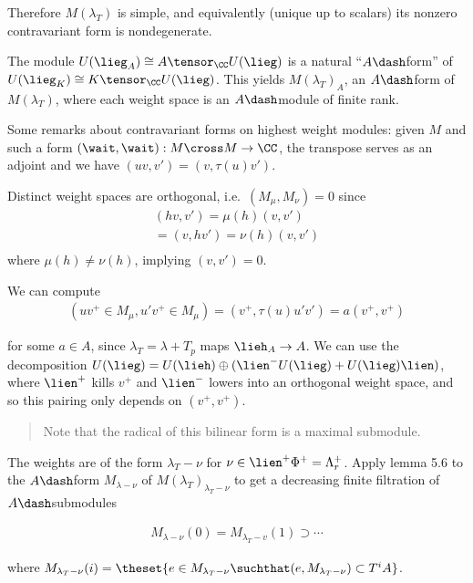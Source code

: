 Therefore \(M(\lambda_T)\) is simple, and equivalently (unique up to
scalars) its nonzero contravariant form is nondegenerate.

The module \(U(\lieg_A) \cong A \tensor_\CC U(\lieg)\) is a natural
``\(A\dash\)form'' of \(U(\lieg_K) \cong K \tensor_\CC U(\lieg)\). This
yields \(M(\lambda_T)_A\), an \(A\dash\)form of \(M(\lambda_T)\), where
each weight space is an \(A\dash\)module of finite rank.

Some remarks about contravariant forms on highest weight modules: given
\(M\) and such a form \((\wait, \wait): M\cross M \to \CC\), the
transpose serves as an adjoint and we have
\((uv, v') = (v, \tau(u) v')\).

Distinct weight spaces are orthogonal, i.e.~\((M_\mu, M_\nu) = 0\) since
\begin{align*}
(hv, v') = \mu(h) (v, v') \\
= (v, hv') = \nu(h) (v, v') \\
\end{align*} where \(\mu(h) \neq \nu(h)\), implying \((v, v') = 0\).

We can compute \begin{align*}
(u v^+ \in M_\mu, u' v^+ \in M_\mu) = (v^+, \tau(u) u' v') = a (v^+, v^+)
\end{align*}

for some \(a\in A\), since \(\lambda_T = \lambda + T_p\) maps
\(\lieh_A \to A\). We can use the decomposition
\(U(\lieg) = U(\lieh) \oplus (\lien^- U(\lieg) + U(\lieg) \lien)\),
where \(\lien^+\) kills \(v^+\) and \(\lien^-\) lowers into an
orthogonal weight space, and so this pairing only depends on
\((v^+, v^+)\).

\begin{quote}
Note that the radical of this bilinear form is a maximal submodule.
\end{quote}

The weights are of the form \(\lambda_T - \nu\) for
\(\nu \in \lien^+ \Phi^+ = \Lambda_r^+\). Apply lemma 5.6 to the
\(A\dash\)form \(M_{\lambda - \nu}\) of
\(M(\lambda_T)_{\lambda_T - \nu}\) to get a decreasing finite filtration
of \(A\dash\)submodules

\begin{align*}
M_{\lambda-\nu}(0)=M_{\lambda_{T}-v}(1) \supset \cdots
\end{align*}

where
\(M_{\lambda_T - \nu}(i) = \theset{e\in M_{\lambda_T - \nu} \suchthat (e, M_{\lambda_T - \nu}) \subset T^i A}\).

